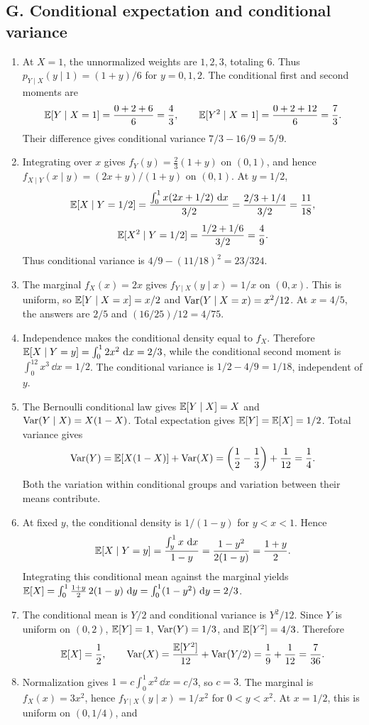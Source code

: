 \subsection{G. Conditional expectation and conditional variance}
\begin{enumerate}[label=\textbf{G\arabic*.},leftmargin=*,itemsep=1em]
\item At $X=1$, the unnormalized weights are $1,2,3$, totaling $6$. Thus $p_{Y\mid X}(y\mid1)=(1+y)/6$ for $y=0,1,2$. The conditional first and second moments are
\[
\mathbb E[Y\mid X=1]=\frac{0+2+6}{6}=\frac43,\qquad
\mathbb E[Y^2\mid X=1]=\frac{0+2+12}{6}=\frac73.
\]
Their difference gives conditional variance $7/3-16/9=5/9$.
\item Integrating over $x$ gives $f_Y(y)=\tfrac23(1+y)$ on $(0,1)$, and hence $f_{X\mid Y}(x\mid y)=(2x+y)/(1+y)$ on $(0,1)$. At $y=1/2$,
\[
\mathbb E[X\mid Y=1/2]=\frac{\int_0^1x(2x+1/2)\,\,\mathrm d x}{3/2}
=\frac{2/3+1/4}{3/2}=\frac{11}{18},
\]
\[
\mathbb E[X^2\mid Y=1/2]=\frac{1/2+1/6}{3/2}=\frac49.
\]
Thus conditional variance is $4/9-(11/18)^2=23/324$.
\item The marginal $f_X(x)=2x$ gives $f_{Y\mid X}(y\mid x)=1/x$ on $(0,x)$. This is uniform, so $\mathbb E[Y\mid X=x]=x/2$ and $\operatorname{Var}(Y\mid X=x)=x^2/12$. At $x=4/5$, the answers are $2/5$ and $(16/25)/12=4/75$.
\item Independence makes the conditional density equal to $f_X$. Therefore $\mathbb E[X\mid Y=y]=\int_0^12x^2\,\,\mathrm d x=2/3$, while the conditional second moment is $\int_0^12x^3\,\dd x=1/2$. The conditional variance is $1/2-4/9=1/18$, independent of $y$.
\item The Bernoulli conditional law gives $\mathbb E[Y\mid X]=X$ and $\operatorname{Var}(Y\mid X)=X(1-X)$. Total expectation gives $\mathbb E[Y]=\mathbb E[X]=1/2$. Total variance gives
\[
\operatorname{Var}(Y)=\mathbb E[X(1-X)]+\operatorname{Var}(X)
=\left(\frac12-\frac13\right)+\frac1{12}=\frac14.
\]
Both the variation within conditional groups and variation between their means contribute.
\item At fixed $y$, the conditional density is $1/(1-y)$ for $y<x<1$. Hence
\[
\mathbb E[X\mid Y=y]=\frac{\int_y^1x\,\,\mathrm d x}{1-y}
=\frac{1-y^2}{2(1-y)}=\frac{1+y}{2}.
\]
Integrating this conditional mean against the marginal yields $\mathbb E[X]=\int_0^1\frac{1+y}{2}\,2(1-y)\,\,\mathrm d y=\int_0^1(1-y^2)\,\,\mathrm d y=2/3$.
\item The conditional mean is $Y/2$ and conditional variance is $Y^2/12$. Since $Y$ is uniform on $(0,2)$, $\mathbb E[Y]=1$, $\operatorname{Var}(Y)=1/3$, and $\mathbb E[Y^2]=4/3$. Therefore
\[
\mathbb E[X]=\frac12,\qquad
\operatorname{Var}(X)=\frac{\mathbb E[Y^2]}{12}+\operatorname{Var}(Y/2)
=\frac19+\frac1{12}=\frac7{36}.
\]
\item Normalization gives $1=c\int_0^1x^2\,\dd x=c/3$, so $c=3$. The marginal is $f_X(x)=3x^2$, hence $f_{Y\mid X}(y\mid x)=1/x^2$ for $0<y<x^2$. At $x=1/2$, this is uniform on $(0,1/4)$, and

\end{enumerate}
